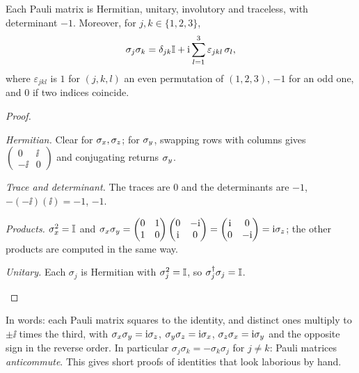 \begin{proposition}\label{prop:pauli}
  Each Pauli matrix is Hermitian, unitary, involutory and traceless, with determinant $-1$. Moreover, for $j,k\in\{1,2,3\}$,
  \[
    \sigma_j\sigma_k=\delta_{jk}\mathbb{I}+\mathrm{i}\sum_{l=1}^{3}\varepsilon_{jkl}\,\sigma_l,
  \]
  where $\varepsilon_{jkl}$ is $1$ for $(j,k,l)$ an even permutation of $(1,2,3)$, $-1$ for an odd one, and $0$ if two indices coincide.
\end{proposition}
\begin{proof}
  \begin{steps}
    \item \emph{Hermitian.} Clear for $\sigma_x,\sigma_z$; for $\sigma_y$, swapping rows with columns gives $\begin{pmatrix}0&\ii\\-\ii&0\end{pmatrix}$ and conjugating returns $\sigma_y$.
    \item \emph{Trace and determinant.} The traces are $0$ and the determinants are $-1$, $-(-\ii)(\ii)=-1$, $-1$.
    \item \emph{Products.} $\sigma_x^2=\mathbb{I}$ and $\sigma_x\sigma_y=\begin{pmatrix}0&1\\1&0\end{pmatrix}\begin{pmatrix}0&-\mathrm{i}\\\mathrm{i}&0\end{pmatrix}=\begin{pmatrix}\mathrm{i}&0\\0&-\mathrm{i}\end{pmatrix}=\mathrm{i}\sigma_z$; the other products are computed in the same way.
    \item \emph{Unitary.} Each $\sigma_j$ is Hermitian with $\sigma_j^2=\mathbb{I}$, so $\sigma_j^\dagger\sigma_j=\mathbb{I}$. \qedhere
  \end{steps}
\end{proof}

In words: each Pauli matrix squares to the identity, and distinct ones multiply to $\pm\ii$ times the third, with $\sigma_x\sigma_y=\mathrm{i}\sigma_z$, $\sigma_y\sigma_z=\mathrm{i}\sigma_x$, $\sigma_z\sigma_x=\mathrm{i}\sigma_y$ and the opposite sign in the reverse order. In particular $\sigma_j\sigma_k=-\sigma_k\sigma_j$ for $j\neq k$: Pauli matrices \emph{anticommute}. This gives short proofs of identities that look laborious by hand.

